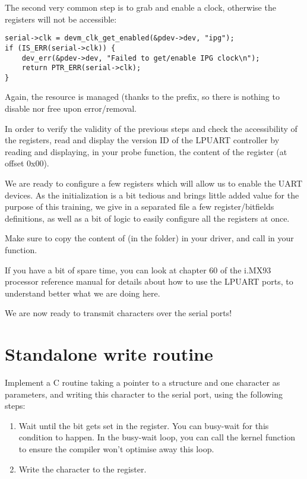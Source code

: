 The second very common step is to grab and enable a clock, otherwise the
registers will not be accessible:

\begin{verbatim}
serial->clk = devm_clk_get_enabled(&pdev->dev, "ipg");
if (IS_ERR(serial->clk)) {
	dev_err(&pdev->dev, "Failed to get/enable IPG clock\n");
	return PTR_ERR(serial->clk);
}
\end{verbatim}

Again, the resource is managed (thanks to the  prefix, so there is
nothing to disable nor free upon error/removal.

In order to verify the validity of the previous steps and check the
accessibility of the registers, read and display the version ID of the LPUART
controller by reading and displaying, in your probe function, the content of the
 register (at offset 0x00).

We are ready to configure a few registers which will allow us to enable the UART
devices. As the initialization is a bit tedious and brings little added value
for the purpose of this training, we give in a separated file a few
register/bitfields definitions, as well as a bit of logic to easily configure
all the registers at once.

Make sure to copy the content of  (in the 
folder) in your driver, and call  in
your  function.

If you have a bit of spare time, you can look at chapter 60 of the i.MX93
processor reference manual for details about how to use the LPUART ports, to
understand better what we are doing here.

We are now ready to transmit characters over the serial ports!

\section{Standalone write routine}

Implement a C routine taking a pointer to a 
structure and one character as parameters, and writing
this character to the serial port, using the following steps:

\begin{enumerate}
\item Wait until the  bit gets set in the
   register. You can busy-wait for this condition to happen.
  In the busy-wait loop, you can call the  kernel function
  to ensure the compiler won't optimise away this loop.
\item Write the character to the  register.
\end{enumerate}

